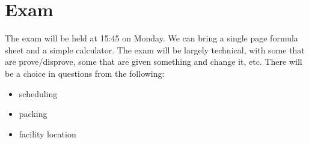 \documentclass{idc_msc}
\begin{document}
\section{Exam}

The exam will be held at 15:45 on Monday.
We can bring a single page formula sheet and a simple calculator.
The exam will be largely technical, with some that are prove/disprove, some that are given something and change it, etc.
There will be a choice in questions from the following:

\begin{itemize}
  \item scheduling
  \item packing
  \item facility location
\end{itemize}



\end{document}
